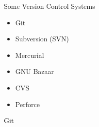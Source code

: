 \begin{frame}
\begin{center}{\large Some Version Control Systems}\end{center}

  \begin{itemize}
    \item Git
    \item Subversion (SVN)
    \item Mercurial
    \item GNU Bazaar
    \item CVS
    \item Perforce
  \end{itemize}

\end{frame}
\begin{frame}
\begin{center}{\large Git}\end{center}
\end{frame}

